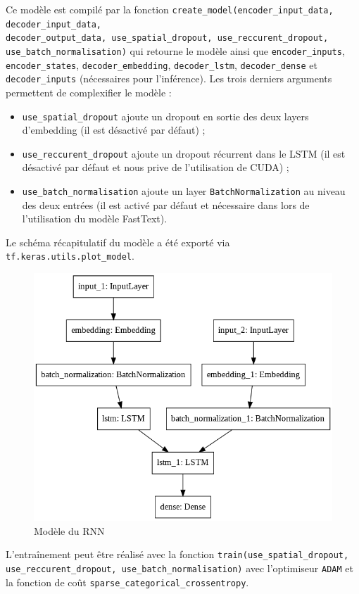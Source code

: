 \documentclass[10pt,a4paper]{article}
\begin{document}
Ce modèle est compilé par la fonction \texttt{create\_model(encoder\_input\_data, decoder\_input\_data, \\ decoder\_output\_data, use\_spatial\_dropout, use\_reccurent\_dropout, use\_batch\_normalisation)} qui retourne le modèle ainsi que \texttt{encoder\_inputs}, \texttt{encoder\_states}, \texttt{decoder\_embedding}, \texttt{decoder\_lstm}, \texttt{decoder\_dense} et \texttt{decoder\_inputs} (nécessaires pour l'inférence). Les trois derniers arguments permettent de complexifier le modèle :
\begin{itemize}
	\item \texttt{use\_spatial\_dropout} ajoute un dropout en sortie des deux layers d'embedding (il est désactivé par défaut) ;
	\item \texttt{use\_reccurent\_dropout} ajoute un dropout récurrent dans le LSTM (il est désactivé par défaut et nous prive de l'utilisation de CUDA) ;
	\item \texttt{use\_batch\_normalisation} ajoute un layer \texttt{BatchNormalization} au niveau des deux entrées (il est activé par défaut et nécessaire dans lors de l'utilisation du modèle FastText).
\end{itemize}
Le schéma récapitulatif du modèle a été exporté via \texttt{tf.keras.utils.plot\_model}.
\begin{figure}
	\centering
	\includegraphics[scale=0.5]{model.png}
	\caption{Modèle du RNN}
\end{figure}
L'entraînement peut être réalisé avec la fonction \texttt{train(use\_spatial\_dropout, use\_reccurent\_dropout, use\_batch\_normalisation)} avec l'optimiseur \texttt{ADAM} et la fonction de coût \texttt{sparse\_categorical\_crossentropy}.
\end{document}
